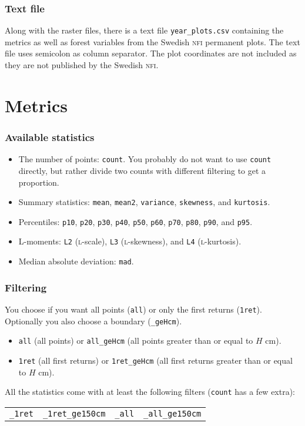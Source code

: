 \documentclass[10pt,english,a4paper
]{article}
\newcommand{\tabrow}[1]{\mname{#1\_1ret}	& \mname{#1\_1ret\_ge150cm}	& \mname{#1\_all}	& \mname{#1\_all\_ge150cm}	\\}
\newcommand{\mname}[1]{{\small\texttt{#1}}}
\begin{document}
\subsubsection{Text file}
Along with the raster files, there is a text file \mname{year\_plots.csv} containing the metrics as well as forest variables from the Swedish \textsc{nfi} permanent plots. The text file uses semicolon as column separator. The plot coordinates are not included as they are not published by the Swedish \textsc{nfi}. 


\section{Metrics}\label{sec:metrics}

\subsubsection{Available statistics}\label{sec:statistics}
\begin{itemize}
	\item The number of points: \mname{count}. You probably do not want to use \mname{count} directly, but rather divide two counts with different filtering to get a proportion. 
	\item Summary statistics: \mname{mean}, \mname{mean2}, \mname{variance}, \mname{skewness}, and \mname{kurtosis}.
	\item Percentiles: \mname{p10}, \mname{p20}, \mname{p30}, \mname{p40}, \mname{p50}, \mname{p60}, \mname{p70}, 
								\mname{p80}, \mname{p90}, and \mname{p95}. 
	\item L-moments: \mname{L2} (\textsc{l}-scale), \mname{L3} (\textsc{l}-skewness), and \mname{L4} (\textsc{l}-kurtosis). 
	\item Median absolute deviation: \mname{mad}. 
\end{itemize}

\subsubsection{Filtering}\label{sec:filtering}
You choose if you want all points (\mname{all}) or only the first returns (\mname{1ret}). Optionally you also choose a boundary (\mname{\_geHcm}).
\begin{itemize}
	\item \mname{all} (all points) or \mname{all\_geHcm} (all points greater than or equal to $H$ cm). 
	\item \mname{1ret} (all first returns) or \mname{1ret\_geHcm} (all first returns greater than or equal to $H$ cm).
\end{itemize}
All the statistics come with at least the following filters (\mname{count} has a few extra):
\\{\small\begin{tabular}{@{}l@{, }l@{, }l@{, and }l@{.}}
	\tabrow{\mbox{}}
\end{tabular}}
\end{document}
